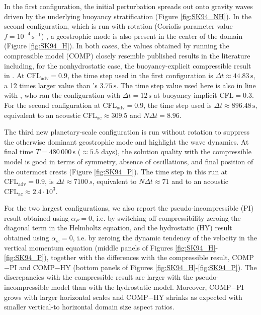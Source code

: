 \documentclass{ametsoc}
\theoremstyle{definition}
\newcommand{\dt}{\Delta t}
\begin{document}
In the first configuration, the initial perturbation spreads out onto gravity waves driven by the underlying buoyancy stratification (Figure \ref{fig:SK94_NH}). In the second configuration, which is run with rotation (Coriolis parameter value $f=10^{-4}\,\textrm{s}^{-1}$) , a geostrophic mode is also present in the center of the domain (Figure \ref{fig:SK94_H}). In both cases, the values obtained by running the compressible model (COMP) closely resemble published results in the literature including, for the nonhydrostatic case, the buoyancy-explicit compressible result in \cite{BenacchioEtAl2014}. At CFL$_\textrm{adv}=0.9$, the time step used in the first configuration is $\Delta t\approx44.83\,\textrm{s}$, a 12 times larger value than \cite{BenacchioEtAl2014}'s $3.75\,\textrm{s}$. The time step value used here is also in line with \cite{MelvinEtAl2018}, who ran the configuration with $\dt=12\,\textrm{s}$ at buoyancy-implicit CFL$=0.3$. For the second configuration at CFL$_\textrm{adv}=0.9$, the time step used is $\Delta t\approx896.48\,\textrm{s}$, equivalent to an acoustic $\mathrm{CFL}_{\mathrm{ac}}\approx309.5$ and $N\dt = 8.96$.

The third new planetary-scale configuration is run without rotation to suppress the otherwise dominant geostrophic mode and highlight the wave dynamics. At final time $T=480\,000\,\textrm{s}$ ($\approx5.5$ days), the solution quality with the compressible model is good in terms of symmetry, absence of oscillations, and final position of the outermost crests (Figure \ref{fig:SK94_P}). The time step in this run at $\mathrm{CFL}_\mathrm{adv} = 0.9$, is $\dt\approx7100\,s$, equivalent to $N \dt\approx71$ and to an acoustic $\mathrm{CFL}_\mathrm{ac}\approx2.4\cdot 10^3$.

For the two largest configurations, we also report the pseudo-incompressible (PI) result obtained using $\alpha_P=0$, i.e. by switching off compressibility zeroing the diagonal term in the Helmholtz equation, and the hydrostatic (HY) result obtained using $\alpha_w=0$, i.e. by zeroing the dynamic tendency of the velocity in the vertical momentum equation (middle panels of Figures \ref{fig:SK94_H}-\ref{fig:SK94_P}), together with the differences with the compressible result, COMP$-$PI and COMP$-$HY (bottom panels of Figures \ref{fig:SK94_H}-\ref{fig:SK94_P}). The discrepancies with the compressible result are larger with the pseudo-incompressible model than with the hydrostatic model. Moreover, COMP$-$PI grows with larger horizontal scales and COMP$-$HY shrinks as expected with smaller vertical-to horizontal domain size aspect ratios.
\end{document}
